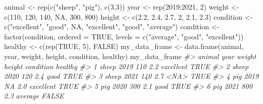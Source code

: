 \documentclass[
]{book}
\newenvironment{Shaded}{\begin{snugshade}}{\end{snugshade}}
\newcommand{\AttributeTok}[1]{\textcolor[rgb]{0.77,0.63,0.00}{#1}}
\newcommand{\CommentTok}[1]{\textcolor[rgb]{0.56,0.35,0.01}{\textit{#1}}}
\newcommand{\ConstantTok}[1]{\textcolor[rgb]{0.00,0.00,0.00}{#1}}
\newcommand{\DecValTok}[1]{\textcolor[rgb]{0.00,0.00,0.81}{#1}}
\newcommand{\FloatTok}[1]{\textcolor[rgb]{0.00,0.00,0.81}{#1}}
\newcommand{\FunctionTok}[1]{\textcolor[rgb]{0.00,0.00,0.00}{#1}}
\newcommand{\NormalTok}[1]{#1}
\newcommand{\OtherTok}[1]{\textcolor[rgb]{0.56,0.35,0.01}{#1}}
\newcommand{\SpecialCharTok}[1]{\textcolor[rgb]{0.00,0.00,0.00}{#1}}
\newcommand{\StringTok}[1]{\textcolor[rgb]{0.31,0.60,0.02}{#1}}
\begin{document}
\begin{Shaded}
\begin{Highlighting}[]
\NormalTok{animal }\OtherTok{\textless{}{-}} \FunctionTok{rep}\NormalTok{(}\FunctionTok{c}\NormalTok{(}\StringTok{"sheep"}\NormalTok{, }\StringTok{"pig"}\NormalTok{), }\FunctionTok{c}\NormalTok{(}\DecValTok{3}\NormalTok{,}\DecValTok{3}\NormalTok{))}
\NormalTok{year }\OtherTok{\textless{}{-}} \FunctionTok{rep}\NormalTok{(}\DecValTok{2019}\SpecialCharTok{:}\DecValTok{2021}\NormalTok{, }\DecValTok{2}\NormalTok{)}
\NormalTok{weight }\OtherTok{\textless{}{-}} \FunctionTok{c}\NormalTok{(}\DecValTok{110}\NormalTok{, }\DecValTok{120}\NormalTok{, }\DecValTok{140}\NormalTok{, }\ConstantTok{NA}\NormalTok{, }\DecValTok{300}\NormalTok{, }\DecValTok{800}\NormalTok{)}
\NormalTok{height }\OtherTok{\textless{}{-}} \FunctionTok{c}\NormalTok{(}\FloatTok{2.2}\NormalTok{, }\FloatTok{2.4}\NormalTok{, }\FloatTok{2.7}\NormalTok{, }\DecValTok{2}\NormalTok{, }\FloatTok{2.1}\NormalTok{, }\FloatTok{2.3}\NormalTok{)}
\NormalTok{condition }\OtherTok{\textless{}{-}} \FunctionTok{c}\NormalTok{(}\StringTok{"excellent"}\NormalTok{, }\StringTok{"good"}\NormalTok{, }\ConstantTok{NA}\NormalTok{, }\StringTok{"excellent"}\NormalTok{, }\StringTok{"good"}\NormalTok{, }\StringTok{"average"}\NormalTok{)}
\NormalTok{condition }\OtherTok{\textless{}{-}} \FunctionTok{factor}\NormalTok{(condition, }\AttributeTok{ordered =} \ConstantTok{TRUE}\NormalTok{, }\AttributeTok{levels =} \FunctionTok{c}\NormalTok{(}\StringTok{"average"}\NormalTok{, }\StringTok{"good"}\NormalTok{, }\StringTok{"excellent"}\NormalTok{))}
\NormalTok{healthy }\OtherTok{\textless{}{-}} \FunctionTok{c}\NormalTok{(}\FunctionTok{rep}\NormalTok{(}\ConstantTok{TRUE}\NormalTok{, }\DecValTok{5}\NormalTok{), }\ConstantTok{FALSE}\NormalTok{)}
\NormalTok{my\_data\_frame }\OtherTok{\textless{}{-}} \FunctionTok{data.frame}\NormalTok{(animal, year, weight, height, condition, healthy)}
\NormalTok{my\_data\_frame}
\CommentTok{\#\textgreater{}   animal year weight height condition healthy}
\CommentTok{\#\textgreater{} 1  sheep 2019    110    2.2 excellent    TRUE}
\CommentTok{\#\textgreater{} 2  sheep 2020    120    2.4      good    TRUE}
\CommentTok{\#\textgreater{} 3  sheep 2021    140    2.7      \textless{}NA\textgreater{}    TRUE}
\CommentTok{\#\textgreater{} 4    pig 2019     NA    2.0 excellent    TRUE}
\CommentTok{\#\textgreater{} 5    pig 2020    300    2.1      good    TRUE}
\CommentTok{\#\textgreater{} 6    pig 2021    800    2.3   average   FALSE}
\end{Highlighting}
\end{Shaded}
\end{document}
